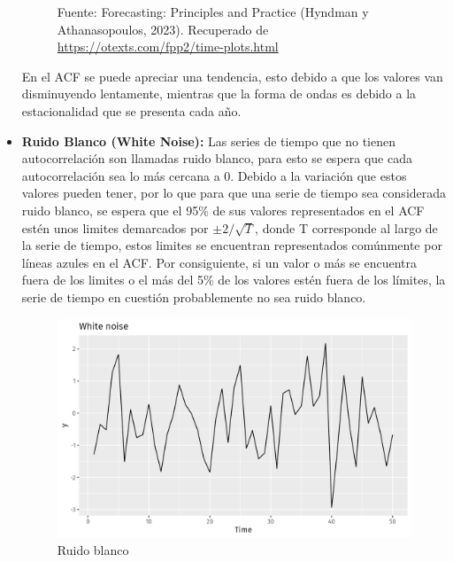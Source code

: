 \begin{itemize}
\begin{figure}[H]
        \begin{minipage}[t]{0.9\textwidth}
            Fuente: Forecasting: Principles and Practice (Hyndman y Athanasopoulos, 2023). Recuperado de \url{https://otexts.com/fpp2/time-plots.html}
        \end{minipage}
    \end{figure}

    En el ACF se puede apreciar una tendencia, esto debido a que los valores van disminuyendo lentamente, mientras que la forma de ondas es debido a la estacionalidad que se presenta cada año.

    \item \textbf{Ruido Blanco (White Noise):} Las series de tiempo que no tienen autocorrelación son llamadas ruido blanco, para esto se espera que cada autocorrelación sea lo más cercana a 0. Debido a la variación que estos valores pueden tener, por lo que para que una serie de tiempo sea considerada ruido blanco, se espera que el 95\% de sus valores representados en el ACF estén unos limites demarcados por $\pm{2}/\sqrt{T}$, donde T corresponde al largo de la serie de tiempo, estos limites se encuentran representados comúnmente por líneas azules en el ACF. Por consiguiente, si un valor o más se encuentra fuera de los limites o el más del 5\% de los valores estén fuera de los límites, la serie de tiempo en cuestión probablemente no sea ruido blanco.

    \begin{figure}[H]
        \begin{minipage}[t]{0.9\textwidth}
            \caption{Ruido blanco}
            \label{whitenoise1}        
        \end{minipage}
    
        \vspace{10pt}
    
        \begin{minipage}[b]{1.1\textwidth}
            \centering
            \includegraphics[width=\textwidth]{img/wnoise-1.png}        
        \end{minipage}
    

\end{figure}
\end{itemize}
